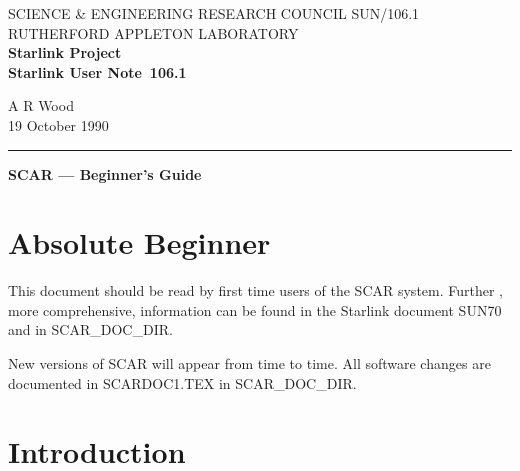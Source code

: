 
\pagestyle{myheadings}

\newcommand{\stardoccategory}  {Starlink User Note}
\newcommand{\stardocinitials}  {SUN}
\newcommand{\stardocnumber}    {106.1}
\newcommand{\stardocauthors}   {A R Wood}
\newcommand{\stardocdate}      {19 October 1990}
\newcommand{\stardoctitle}     {SCAR --- Beginner's Guide}

\newcommand{\stardocname}{\stardocinitials /\stardocnumber}
\markright{\stardocname}
\setlength{\textwidth}{160mm}
\setlength{\textheight}{240mm}
\setlength{\topmargin}{-5mm}
\setlength{\oddsidemargin}{0mm}
\setlength{\evensidemargin}{0mm}
\setlength{\parindent}{0mm}
\setlength{\parskip}{\medskipamount}
\setlength{\unitlength}{1mm}


\thispagestyle{empty}
SCIENCE \& ENGINEERING RESEARCH COUNCIL \hfill \stardocname\\
RUTHERFORD APPLETON LABORATORY\\
{\large\bf Starlink Project\\}
{\large\bf \stardoccategory\ \stardocnumber}
\begin{flushright}
\stardocauthors\\
\stardocdate
\end{flushright}
\vspace{-4mm}
\rule{\textwidth}{0.5mm}
\vspace{5mm}
\begin{center}
{\Large\bf \stardoctitle}
\end{center}
\vspace{5mm}

\section {Absolute Beginner}

This document should be read by first time users of the SCAR system. Further
, more comprehensive, information can be found in the Starlink document
SUN70 and in SCAR\_DOC\_DIR.

New versions of SCAR will appear from time to time.
All software changes are documented in SCARDOC1.TEX in SCAR\_DOC\_DIR.

\section {Introduction}

